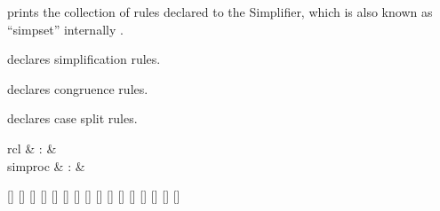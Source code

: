 \begin{isabellebody}
\begin{isamarkuptext}
  \begin{description}

  \item \hyperlink{command.print-simpset}{\mbox{}} prints the collection of rules
  declared to the Simplifier, which is also known as ``simpset''
  internally \cite{isabelle-ref}.

  \item \hyperlink{attribute.simp}{\mbox{}} declares simplification rules.

  \item \hyperlink{attribute.cong}{\mbox{}} declares congruence rules.

  \item \hyperlink{attribute.split}{\mbox{}} declares case split rules.

  \end{description}%
\end{isamarkuptext}%
\isamarkuptrue%
%
\isamarkuptrue%
%
\begin{isamarkuptext}%
\begin{matharray}{rcl}
    \hypertarget{command.simproc-setup}{\hyperlink{command.simproc-setup}{\mbox{}}} & : &  \\
    simproc & : &  \\
  \end{matharray}

  \begin{railoutput}
[]
[]
[]
\rail@plus
{}[]
[]
\rail@endplus
{}[]
[]
[]
\rail@bar
{}
[]
\rail@plus
{}[]
\rail@endplus
\rail@endbar
\rail@end
{}
[]
\rail@bar
\rail@bar
{}
[]
[]
\rail@endbar
{}
[]
[]
\rail@endbar
\rail@plus
{}[]
\rail@endplus
\rail@end
\end{railoutput}



\end{isamarkuptext}
\end{isabellebody}
